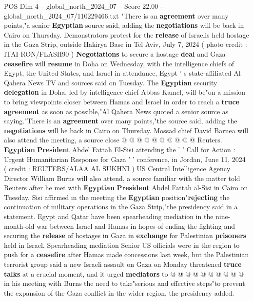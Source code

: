 \begin{textsample}{POS Dim 4 – global\_north\_2024\_07 – Score 22.00 – global\_north\_2024\_07/110229466.txt}  \label{ex:f4_pos_196}
"There is an \textbf{agreement} over many points,"a senior \textbf{Egyptian} source said, adding the \textbf{negotiations} will be back in Cairo on Thursday.
Demonstrators protest for the \textbf{release} of Israelis held hostage in the Gaza Strip, outside Hakirya Base in Tel Aviv, July 7, 2024 ( photo credit : ITAI RON/FLASH90 ) \textbf{Negotiations} to secure a hostage \textbf{deal} and Gaza \textbf{ceasefire} will \textbf{resume} in Doha on Wednesday, with the intelligence chiefs of Egypt, the United States, and Israel in attendance, Egypt ' s state-affiliated Al Qahera News TV and sources said on Tuesday.
The \textbf{Egyptian} security \textbf{delegation} in Doha, led by intelligence chief Abbas Kamel, will be"on a mission to bring viewpoints closer between Hamas and Israel in order to reach a \textbf{truce} \textbf{agreement} as soon as possible,"Al Qahera News quoted a senior source as saying."There is an \textbf{agreement} over many points,"the source said, adding the \textbf{negotiations} will be back in Cairo on Thursday.
Mossad chief David Barnea will also attend the meeting, a source close @ @ @ @ @ @ @ @ @ @ Reuters. \textbf{Egyptian} \textbf{President} Abdel Fattah El-Sisi attending the ' ' Call for Action : Urgent Humanitarian Response for Gaza ' ' conference, in Jordan, June 11, 2024 ( credit : REUTERS/ALAA AL SUKHNI ) US Central Intelligence Agency Director William Burns will also attend, a source familiar with the matter told Reuters after he met with \textbf{Egyptian} \textbf{President} Abdel Fattah al-Sisi in Cairo on Tuesday.
Sisi affirmed in the meeting the \textbf{Egyptian} position"\textbf{rejecting} the continuation of military operations in the Gaza Strip,"the presidency said in a statement.
Egypt and Qatar have been spearheading mediation in the nine-month-old war between Israel and Hamas in hopes of ending the fighting and securing the \textbf{release} of hostages in Gaza in \textbf{exchange} for Palestinian \textbf{prisoners} held in Israel.
Spearheading mediation Senior US officials were in the region to push for a \textbf{ceasefire} after Hamas made concessions last week, but the Palestinian terrorist group said a new Israeli assault on Gaza on Monday threatened \textbf{truce} \textbf{talks} at a crucial moment, and it urged \textbf{mediators} to @ @ @ @ @ @ @ @ @ @ in his meeting with Burns the need to take"serious and effective steps"to prevent the expansion of the Gaza conflict in the wider region, the presidency added.

\end{textsample}
